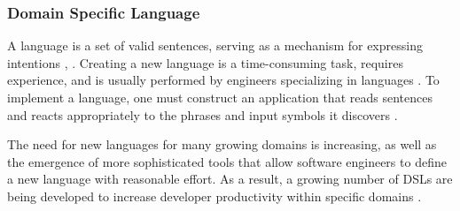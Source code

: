 \subsubsection{Domain Specific Language}


A language is a set of valid sentences, serving as a mechanism for expressing intentions \cite{parr2010}, \cite{bentley1987}. Creating a new language is a time-consuming task, requires experience, and is usually performed by engineers specializing in languages \cite{karsai2014}. To implement a language, one must construct an application that reads sentences and reacts appropriately to the phrases and input symbols it discovers \cite{parr2013}.


The need for new languages for many growing domains is increasing, as well as the emergence of more sophisticated tools that allow software engineers to define a new language with reasonable effort. As a result, a growing number of DSLs are being developed to increase developer productivity within specific domains \cite{karsai2014}. %

